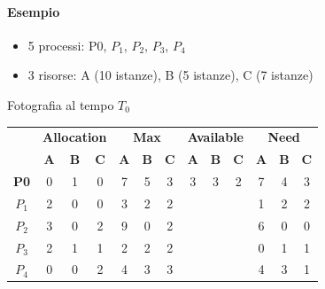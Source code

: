 \documentclass[a4paper]{article}
\begin{document}
\paragraph{Esempio}
\begin{itemize}
    \item 5 processi: P0, $P_1$, $P_2$, $P_3$, $P_4$
    \item 3 risorse: A (10 istanze), B (5 istanze), C (7 istanze)
\end{itemize}
Fotografia al tempo $T_0$
\begin{table}[h!]
    \centering
    \begin{tabular}{c|ccc|ccc|ccc|ccc|}
        \cline{2-13}
                                             & \multicolumn{3}{c|}{\textbf{Allocation}} & \multicolumn{3}{c|}{\textbf{Max}} & \multicolumn{3}{c|}{\textbf{Available}} & \multicolumn{3}{c|}{\textbf{Need}}                                                                                                         \\ \cline{2-13}
                                             & \textbf{A}                               & \textbf{B}                        & \textbf{C}                              & \textbf{A}                         & \textbf{B} & \textbf{C} & \textbf{A} & \textbf{B} & \textbf{C} & \textbf{A} & \textbf{B} & \textbf{C} \\ \hline
        \multicolumn{1}{|c|}{\textbf{P0}}    & 0                                        & 1                                 & 0                                       & 7                                  & 5          & 3          & 3          & 3          & 2          & 7          & 4          & 3          \\
        \multicolumn{1}{|c|}{\textbf{$P_1$}} & 2                                        & 0                                 & 0                                       & 3                                  & 2          & 2          &            &            &            & 1          & 2          & 2          \\
        \multicolumn{1}{|c|}{\textbf{$P_2$}} & 3                                        & 0                                 & 2                                       & 9                                  & 0          & 2          &            &            &            & 6          & 0          & 0          \\
        \multicolumn{1}{|c|}{\textbf{$P_3$}} & 2                                        & 1                                 & 1                                       & 2                                  & 2          & 2          &            &            &            & 0          & 1          & 1          \\
        \multicolumn{1}{|c|}{\textbf{$P_4$}} & 0                                        & 0                                 & 2                                       & 4                                  & 3          & 3          &            &            &            & 4          & 3          & 1          \\ \hline
    \end{tabular}
\end{table}
\end{document}
